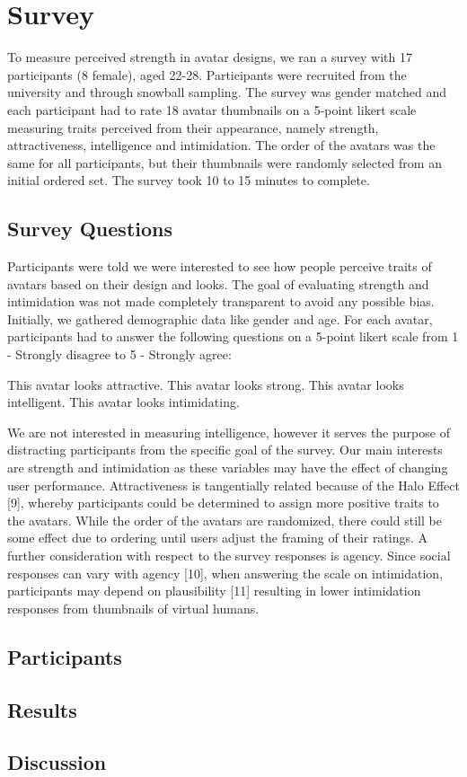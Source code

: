 
\section{Survey}
To measure perceived strength in avatar designs, we ran a survey with 17 participants (8 female), aged 22-28. Participants were recruited from the university and through snowball sampling. The survey was gender matched and each participant had to rate 18 avatar thumbnails on a 5-point likert scale measuring traits perceived from their appearance, namely strength, attractiveness, intelligence and intimidation. The order of the avatars was the same for all participants, but their thumbnails were randomly selected from an initial ordered set. The survey took 10 to 15 minutes to complete. 

\subsection{Survey Questions}
Participants were told we were interested to see how people perceive traits of avatars based on their design and looks. The goal of evaluating strength and intimidation was not made completely transparent to avoid any possible bias. Initially, we gathered demographic data like gender and age. For each avatar, participants had to answer the following questions on a 5-point likert scale from 1 - Strongly disagree to 5 - Strongly agree:

This avatar looks attractive.
This avatar looks strong.
This avatar looks intelligent. 
This avatar looks intimidating.

We are not interested in measuring intelligence, however it serves the purpose of distracting participants from the specific goal of the survey. Our main interests are strength and intimidation as these variables may have the effect of changing user performance. Attractiveness is tangentially related because of the Halo Effect [9], whereby participants could be determined to assign more positive traits to the avatars. While the order of the avatars are randomized, there could still be some effect due to ordering until users adjust the framing of their ratings. A further consideration with respect to the survey responses is agency. Since social responses can vary with agency [10],  when answering the scale on intimidation, participants may depend on plausibility [11] resulting in lower intimidation responses from thumbnails of virtual humans.

\subsection{Participants}
\subsection{Results}


\subsection{Discussion}
